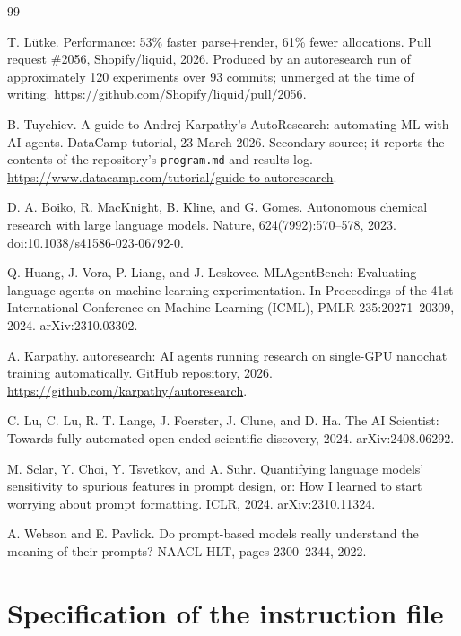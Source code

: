 \documentclass[11pt]{article}
\begin{document}
\begin{thebibliography}{99}

T. L\"utke. Performance: 53\% faster parse+render, 61\% fewer allocations.
Pull request \#2056, Shopify/liquid, 2026. Produced by an autoresearch run of
approximately 120 experiments over 93 commits; unmerged at the time of writing.
\url{https://github.com/Shopify/liquid/pull/2056}.

B. Tuychiev. A guide to Andrej Karpathy's AutoResearch: automating ML with AI
agents. DataCamp tutorial, 23 March 2026. Secondary source; it reports the
contents of the repository's \texttt{program.md} and results log.
\url{https://www.datacamp.com/tutorial/guide-to-autoresearch}.

D. A. Boiko, R. MacKnight, B. Kline, and G. Gomes. Autonomous chemical research
with large language models. Nature, 624(7992):570--578, 2023.
doi:10.1038/s41586-023-06792-0.

Q. Huang, J. Vora, P. Liang, and J. Leskovec. MLAgentBench: Evaluating language
agents on machine learning experimentation. In Proceedings of the 41st
International Conference on Machine Learning (ICML), PMLR 235:20271--20309,
2024. arXiv:2310.03302.

A. Karpathy. autoresearch: AI agents running research on single-GPU nanochat
training automatically. GitHub repository, 2026.
\url{https://github.com/karpathy/autoresearch}.

C. Lu, C. Lu, R. T. Lange, J. Foerster, J. Clune, and D. Ha. The AI Scientist:
Towards fully automated open-ended scientific discovery, 2024. arXiv:2408.06292.

M. Sclar, Y. Choi, Y. Tsvetkov, and A. Suhr. Quantifying language models'
sensitivity to spurious features in prompt design, or: How I learned to start
worrying about prompt formatting. ICLR, 2024. arXiv:2310.11324.

A. Webson and E. Pavlick. Do prompt-based models really understand the meaning
of their prompts? NAACL-HLT, pages 2300--2344, 2022.

\end{thebibliography}



\appendix


\section{Specification of the instruction file}
\label{app:program}
\end{document}
